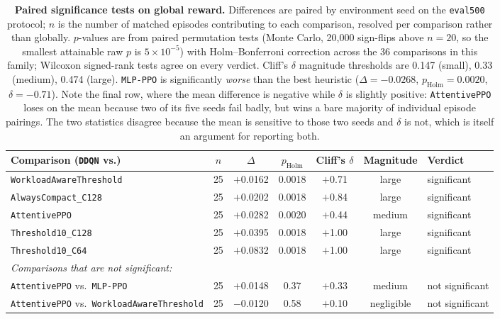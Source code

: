 \documentclass[fleqn,10pt]{wlscirep}
\newcommand{\attentive}{\texttt{AttentivePPO}}
\newcommand{\mlpppo}{\texttt{MLP-PPO}}
\newcommand{\ddqn}{\texttt{DDQN}}
\begin{document}
\begin{table}[!htbp]
\centering
\begin{tabular}{lcccccl}
\toprule
\textbf{Comparison (\ddqn{} vs.)} & $n$ & $\Delta$ & $p_{\text{Holm}}$ &
  \textbf{Cliff's} $\delta$ & \textbf{Magnitude} & \textbf{Verdict} \\
\midrule
\texttt{WorkloadAwareThreshold} & 25 & $+$0.0162 & 0.0018 & $+$0.71 & large  & significant \\
\texttt{AlwaysCompact\_C128}    & 25 & $+$0.0202 & 0.0018 & $+$0.84 & large  & significant \\
\attentive{}                    & 25 & $+$0.0282 & 0.0020 & $+$0.44 & medium & significant \\
\texttt{Threshold10\_C128}      & 25 & $+$0.0395 & 0.0018 & $+$1.00 & large  & significant \\
\texttt{Threshold10\_C64}       & 25 & $+$0.0832 & 0.0018 & $+$1.00 & large  & significant \\
\midrule
\multicolumn{7}{l}{\emph{Comparisons that are not significant:}} \\
\attentive{} vs.\ \mlpppo{}                     & 25 & $+$0.0148 & 0.37 & $+$0.33 & medium & not significant \\
\attentive{} vs.\ \texttt{WorkloadAwareThreshold} & 25 & $-$0.0120 & 0.58 & $+$0.10 & negligible & not significant \\
\bottomrule
\end{tabular}
\caption{\label{tab:significance}\textbf{Paired significance tests on global reward.}
  Differences are paired by environment seed on the \texttt{eval500}
  protocol; $n$ is the number of matched episodes contributing to each
  comparison, resolved per comparison rather than globally. $p$-values
  are from paired permutation tests (Monte Carlo, 20{,}000 sign-flips
  above $n=20$, so the smallest attainable raw $p$ is
  $5\times10^{-5}$) with Holm--Bonferroni correction across the 36
  comparisons in this family; Wilcoxon signed-rank tests agree on every
  verdict. Cliff's $\delta$ magnitude thresholds are 0.147 (small), 0.33
  (medium), 0.474 (large). \mlpppo{} is significantly \emph{worse} than
  the best heuristic ($\Delta = -0.0268$, $p_{\text{Holm}} = 0.0020$,
  $\delta = -0.71$). Note the final row, where the mean difference is
  negative while $\delta$ is slightly positive: \attentive{} loses on the
  mean because two of its five seeds fail badly, but wins a bare
  majority of individual episode pairings. The two statistics disagree
  because the mean is sensitive to those two seeds and $\delta$ is not,
  which is itself an argument for reporting both.}
\end{table}
\end{document}
